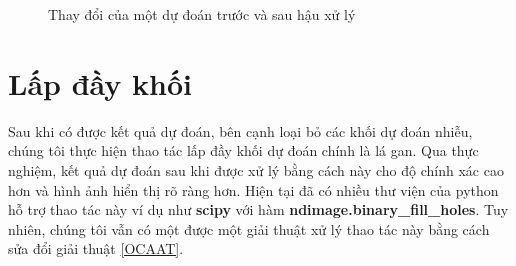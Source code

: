 \begin{figure}[h]
  \centering
  \caption{Thay đổi của một dự đoán trước và sau hậu xử lý}
  \label{fig:ab}
\end{figure}

\section{Lấp đầy khối}
Sau khi có được kết quả dự đoán, bên cạnh loại bỏ các khối dự đoán nhiễu, chúng tôi thực hiện thao tác lấp đầy khối dự đoán chính là lá gan. Qua thực nghiệm, kết quả dự đoán sau khi được xử lý bằng cách này cho độ chính xác cao hơn và hình ảnh hiển thị rõ ràng hơn. Hiện tại đã có nhiều thư viện của python hỗ trợ thao tác này ví dụ như \textbf{scipy} với hàm \textbf{ndimage.binary\_fill\_holes}. Tuy nhiên, chúng tôi vẫn có một được một giải thuật xử lý thao tác này bằng cách sửa đổi giải thuật \ref{OCAAT}.

